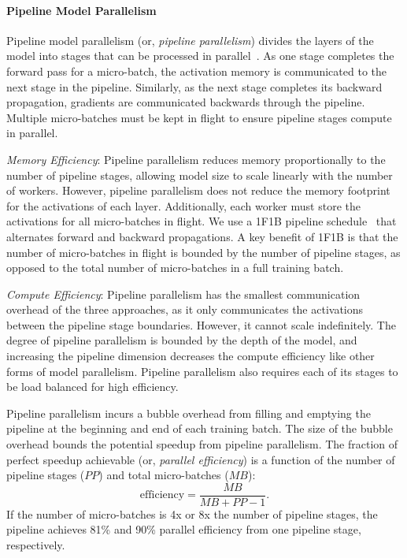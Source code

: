 \documentclass[11pt]{article}
\begin{document}
\paragraph{Pipeline Model Parallelism}
Pipeline model parallelism (or, \emph{pipeline parallelism}) divides the layers of the model into stages that
can be processed in parallel~\cite{huang2019gpipe,narayanan2019pipedream}.
As one
stage completes the forward pass for a
micro-batch, the activation memory is communicated to the next stage in the
pipeline. Similarly, as the next stage completes its backward propagation,
gradients are communicated backwards through the pipeline. Multiple
micro-batches must be kept in flight to ensure pipeline stages compute in
parallel.

\textit{Memory Efficiency}: Pipeline parallelism reduces memory proportionally to
the number of pipeline stages, allowing model size to scale linearly with the
number of workers. However, pipeline parallelism does not reduce the memory
footprint for the activations of each layer. Additionally, each worker must
store the activations for all micro-batches in flight. We use a 1F1B pipeline
schedule~\cite{narayanan2019pipedream} that alternates forward and backward
propagations. A key benefit of 1F1B is that the number of micro-batches in flight
is bounded by the number of pipeline stages, as opposed to the total number of micro-batches
in a full training batch. 

\textit{Compute Efficiency}: Pipeline parallelism has the smallest communication
overhead of the three approaches, as it only communicates the activations 
between the pipeline stage boundaries.
However, it cannot scale indefinitely. The degree of pipeline parallelism is 
bounded by the depth of the model, and increasing the pipeline dimension
decreases the compute efficiency like other forms of model parallelism.
Pipeline parallelism also requires each of its stages to be load
balanced for high efficiency.

Pipeline parallelism incurs a bubble overhead from filling and
emptying the pipeline at the beginning and end of each training batch. The size
of the bubble overhead bounds the potential speedup from pipeline parallelism.
The fraction of perfect speedup achievable (or, \emph{parallel efficiency}) 
is a function of the number of pipeline stages ($PP$) and total micro-batches ($MB$):
$$
    \text{efficiency} = \frac{MB}{MB + PP - 1}.
$$
If the number of micro-batches is 4x or 8x the number of pipeline stages,
the pipeline achieves 81\% and 90\% parallel efficiency from one  pipeline stage,
respectively.
\end{document}
